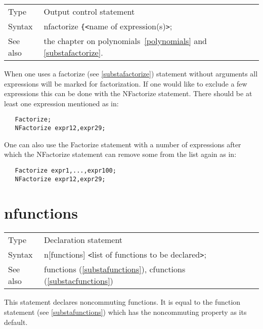 \noindent \begin{tabular}{ll}
Type & Output control statement\\
Syntax & nfactorize \verb:{:{\tt<}name of expression(s){\tt>};
\\ See also & the chapter on polynomials~\ref{polynomials} and 
\ref{substafactorize}.
\end{tabular} \vspace{4mm}

\noindent When one uses a factorize (see \ref{substafactorize}) statement 
without arguments all expressions will be marked for factorization. If one 
would like to exclude a few expressions this can be done with the 
NFactorize statement. There should be at least one expression mentioned as 
in:
\begin{verbatim}
   Factorize;
   NFactorize expr12,expr29;
\end{verbatim}
One can also use the Factorize statement with a number of expressions after 
which the NFactorize statement can remove some from the list again as in:
\begin{verbatim}
   Factorize expr1,...,expr100;
   NFactorize expr12,expr29;
\end{verbatim}

\vspace{10mm}

 
\section{nfunctions}
\label{substanfunctions}

\noindent \begin{tabular}{ll}
Type & Declaration statement\\
Syntax & n[functions] {\tt<}list of functions to be declared{\tt>}; \\
See also & functions (\ref{substafunctions}), cfunctions (\ref{substacfunctions})
\end{tabular} \vspace{4mm}

\noindent This statement declares 
noncommuting functions. It is equal to the 
function statement (see \ref{substafunctions}) which has 
the noncommuting property as its default. \vspace{10mm}


